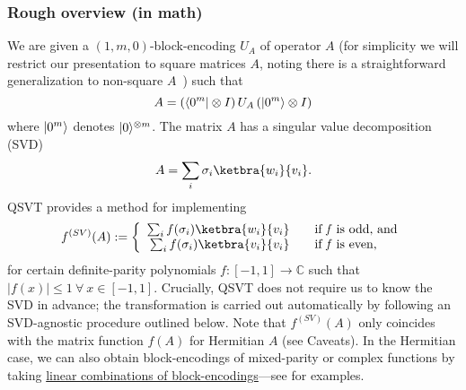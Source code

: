 \begin{refsection}
\subsubsection*{Rough overview (in math)}
We are given a $(1, m, 0)$-block-encoding $U_A$ of operator $A$ (for simplicity we will restrict our presentation to square matrices $A$, noting there is a straightforward generalization to non-square $A$~\cite{gilyen2018QSingValTransf}) such that
\begin{equation*}
    A= \left(\langle0^m\rvert \otimes I \right) U_A \left( \lvert0^m\rangle \otimes I \right)
\end{equation*}
where $\lvert0^m\rangle$ denotes $\lvert0\rangle^{\otimes m}$. The matrix $A$ has a singular value decomposition (SVD) 
\begin{equation}
    A = \sum_i \sigma_i \ketbra{w_i}{v_i}.
\end{equation}
QSVT provides a method for implementing
\begin{equation}
		f^{(SV)}(A):=\left\{\begin{array}{rcl} \sum_i f(\sigma_i) \ketbra{w_i}{v_i} & &\text{if \textit{f} is odd, and}\\
		\sum_i f(\sigma_i) \ketbra{v_i}{v_i}& & \text{if \textit{f} is even,}\end{array}\right.
\end{equation}
for certain definite-parity polynomials $f\colon [-1,1] \rightarrow \mathbb{C}$ such that $|f(x)| \leq 1~\forall~x \in [-1,1]$.
Crucially, QSVT does not require us to know the SVD in advance; the transformation is carried out automatically by following an SVD-agnostic procedure outlined below.
Note that $f^{(SV)}(A)$ only coincides with the matrix function $f(A)$ for Hermitian $A$ (see Caveats). In the Hermitian case, we can also obtain block-encodings of mixed-parity or complex functions by taking \hyperref[prim:ManipulatingBlockEncodings]{linear combinations of block-encodings}---see \cite{dong2020efficientPhaseFindingInQSP} for examples.



\end{refsection}
